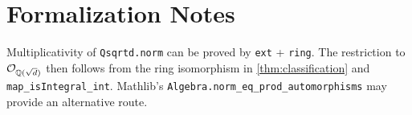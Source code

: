 
\section{Formalization Notes}

\begin{remark}
  Multiplicativity of \texttt{Qsqrtd.norm} can be proved by
  \texttt{ext} + \texttt{ring}.  The restriction to $\mathcal{O}_{\mathbb{Q}(\sqrt{d})}$ then
  follows from the ring isomorphism in \cref{thm:classification}
  and \texttt{map\_isIntegral\_int}.
  Mathlib's \texttt{Algebra.norm\_eq\_prod\_automorphisms} may
  provide an alternative route.
\end{remark}

